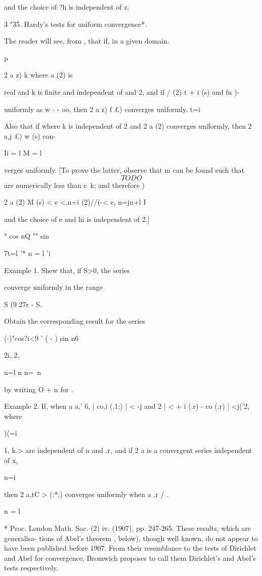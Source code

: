 and the choice of ?h is independent of z.

3 "35. Hardy's tests for uniform convergence*.

The reader will see, from , that if, in a given domain.

p

2 a z) k where a (2) is

real and k is finite and independent of and 2, and if / (2) t + i (s)
and fn )-

uniformly as w - - oo, then 2 a z) f £) converges uniformly. t=i

Also that if where k is independent of 2 and 2 a (2) converges
uniformly, then 2 a,j £) w (s) con-

Ii = l M = l

verges uniformly. [To prove the latter, observe that m can be found
such that
$$
TODO
$$
are numerically less than e\ k; and therefore )

2 a (2) M (s) < e <,n+i (2)//(-< e, n=jn+l I

and the choice of e and hi is independent of 2.]

° cos nQ "" sin %

7t=l '* n = l 'i

Example 1. Shew that, if S>0, the series

converge uniformly in the range

S (9 27r - S.

Obtain the corresponding result for the series

  (-)"cos?i<9 ' ( - ) sin n6

2i, 2,

n=l n n=\ n

by writing O + n for .

Example 2. If, when a a,' 6, | co,i (.1;) | < -j and 2 | < + i (.r) -
co (.r) | <j('2, where

)(=i

 1, k.> are independent of n and .r, and if 2 a is a convergent
series independent of x,

n=i

then 2 a,tC > (:*;) converges uniformly when a .r / . 

n = l

* Proc. London Math. Soc. (2) iv. (1907), pp. 247-265. These results,
which are generalisa- tions of Abel's theorem , below), though
well known, do not appear to have been published before 1907. From
their resemblance to the tests of Dirichlet and Abel for convergence,
Bromwich proposes to call them Dirichlet's and Abel's tests
respectively.

